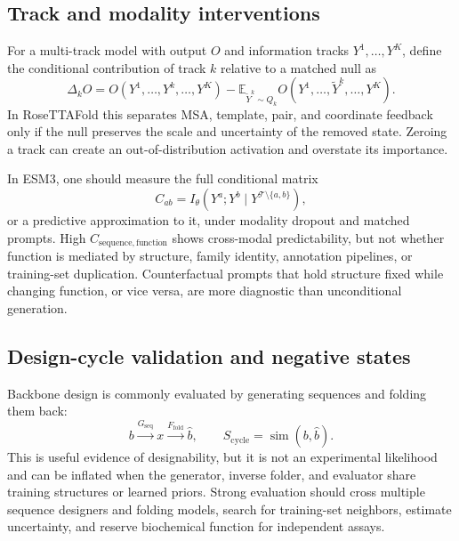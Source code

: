 \documentclass[10pt]{article}
\newcommand{\E}{\mathbb E}
\begin{document}
\subsection{Track and modality interventions}

For a multi-track model with output $O$ and information tracks $Y^1,\ldots,Y^K$, define the
conditional contribution of track $k$ relative to a matched null as
\begin{equation}
\Delta_k O
=O(Y^1,\ldots,Y^k,\ldots,Y^K)
-\E_{\widetilde Y^k\sim Q_k}
O(Y^1,\ldots,\widetilde Y^k,\ldots,Y^K).
\label{eq:track-intervention}
\end{equation}
In RoseTTAFold this separates MSA, template, pair, and coordinate feedback only if the null preserves
the scale and uncertainty of the removed state.  Zeroing a track can create an out-of-distribution
activation and overstate its importance.

In ESM3, one should measure the full conditional matrix
\begin{equation}
C_{ab}=I_\theta(Y^a;Y^b\mid Y^{\mathcal T\setminus\{a,b\}}),
\label{eq:cross-modal-information}
\end{equation}
or a predictive approximation to it, under modality dropout and matched prompts.  High
$C_{\mathrm{sequence},\mathrm{function}}$ shows cross-modal predictability, but not whether function
is mediated by structure, family identity, annotation pipelines, or training-set duplication.
Counterfactual prompts that hold structure fixed while changing function, or vice versa, are more
diagnostic than unconditional generation.

\subsection{Design-cycle validation and negative states}

Backbone design is commonly evaluated by generating sequences and folding them back:
\begin{equation}
b\xrightarrow{G_{\mathrm{seq}}}x
\xrightarrow{F_{\mathrm{fold}}}\widehat b,
\qquad
S_{\mathrm{cycle}}=\operatorname{sim}(b,\widehat b).
\label{eq:design-cycle}
\end{equation}
This is useful evidence of designability, but it is not an experimental likelihood and can be
inflated when the generator, inverse folder, and evaluator share training structures or learned
priors.  Strong evaluation should cross multiple sequence designers and folding models, search for
training-set neighbors, estimate uncertainty, and reserve biochemical function for independent
assays.
\end{document}
